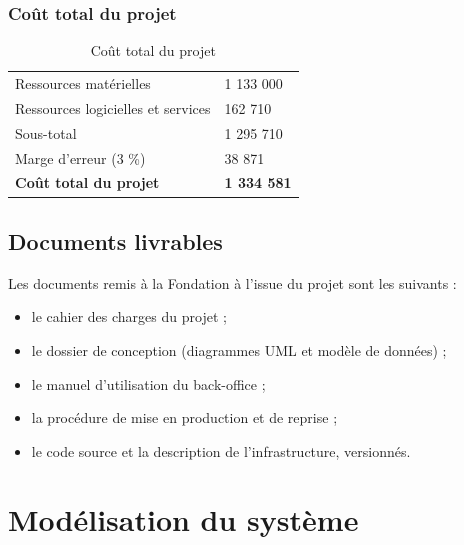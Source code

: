 \subsubsection{Coût total du projet}

\begin{table}[htbp]
\centering
\caption{Coût total du projet}
\label{tab:couttotal}
\small
\begin{tabularx}{\textwidth}{|X|R{3.4cm}|}
\hline
{}
 &  \\ \hline
Ressources matérielles & 1 133 000 \\ \hline
Ressources logicielles et services & 162 710 \\ \hline
Sous-total & 1 295 710 \\ \hline
Marge d'erreur (3 \%) & 38 871 \\ \hline
{}
\textbf{Coût total du projet} & \textbf{1 334 581} \\ \hline
\end{tabularx}
\end{table}

\subsection{Documents livrables}

Les documents remis à la Fondation à l'issue du projet sont les suivants :

\begin{itemize}
  \item le cahier des charges du projet ;
  \item le dossier de conception (diagrammes UML et modèle de données) ;
  \item le manuel d'utilisation du back-office ;
  \item la procédure de mise en production et de reprise ;
  \item le code source et la description de l'infrastructure, versionnés.
\end{itemize}

\section{Modélisation du système}
\label{sec:modelisation}

